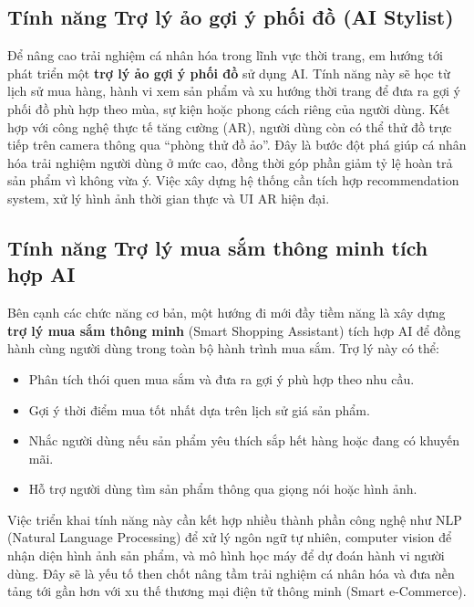 \documentclass[../DoAn.tex]{subfiles}
\begin{document}
\subsection{Tính năng Trợ lý ảo gợi ý phối đồ (AI Stylist)}
Để nâng cao trải nghiệm cá nhân hóa trong lĩnh vực thời trang, em hướng tới phát triển một \textbf{trợ lý ảo gợi ý phối đồ} sử dụng AI. Tính năng này sẽ học từ lịch sử mua hàng, hành vi xem sản phẩm và xu hướng thời trang để đưa ra gợi ý phối đồ phù hợp theo mùa, sự kiện hoặc phong cách riêng của người dùng. Kết hợp với công nghệ thực tế tăng cường (AR), người dùng còn có thể thử đồ trực tiếp trên camera thông qua “phòng thử đồ ảo”. Đây là bước đột phá giúp cá nhân hóa trải nghiệm người dùng ở mức cao, đồng thời góp phần giảm tỷ lệ hoàn trả sản phẩm vì không vừa ý. Việc xây dựng hệ thống cần tích hợp recommendation system, xử lý hình ảnh thời gian thực và UI AR hiện đại.

\subsection{Tính năng Trợ lý mua sắm thông minh tích hợp AI}
Bên cạnh các chức năng cơ bản, một hướng đi mới đầy tiềm năng là xây dựng \textbf{trợ lý mua sắm thông minh} (Smart Shopping Assistant) tích hợp AI để đồng hành cùng người dùng trong toàn bộ hành trình mua sắm. Trợ lý này có thể:
\begin{itemize}
    \item Phân tích thói quen mua sắm và đưa ra gợi ý phù hợp theo nhu cầu.
    \item Gợi ý thời điểm mua tốt nhất dựa trên lịch sử giá sản phẩm.
    \item Nhắc người dùng nếu sản phẩm yêu thích sắp hết hàng hoặc đang có khuyến mãi.
    \item Hỗ trợ người dùng tìm sản phẩm thông qua giọng nói hoặc hình ảnh.
\end{itemize}
Việc triển khai tính năng này cần kết hợp nhiều thành phần công nghệ như NLP (Natural Language Processing) để xử lý ngôn ngữ tự nhiên, computer vision để nhận diện hình ảnh sản phẩm, và mô hình học máy để dự đoán hành vi người dùng. Đây sẽ là yếu tố then chốt nâng tầm trải nghiệm cá nhân hóa và đưa nền tảng tới gần hơn với xu thế thương mại điện tử thông minh (Smart e-Commerce).
\end{document}
